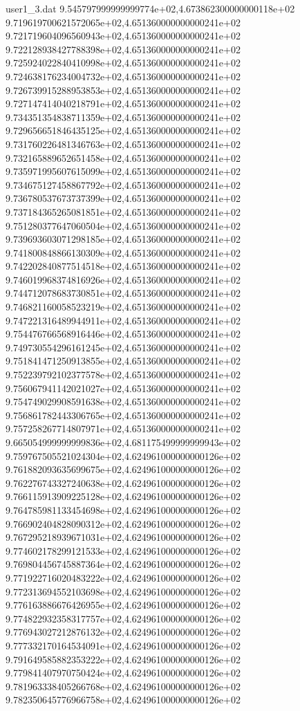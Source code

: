 \begin{filecontents}{user1_3.dat}
9.545797999999999774e+02,4.673862300000000118e+02
9.719619700621572065e+02,4.651360000000000241e+02
9.721719604096560943e+02,4.651360000000000241e+02
9.722128938427788398e+02,4.651360000000000241e+02
9.725924022840410998e+02,4.651360000000000241e+02
9.724638176234004732e+02,4.651360000000000241e+02
9.726739915288953853e+02,4.651360000000000241e+02
9.727147414040218791e+02,4.651360000000000241e+02
9.734351354838711359e+02,4.651360000000000241e+02
9.729656651846435125e+02,4.651360000000000241e+02
9.731760226481346763e+02,4.651360000000000241e+02
9.732165889652651458e+02,4.651360000000000241e+02
9.735971995607615099e+02,4.651360000000000241e+02
9.734675127458867792e+02,4.651360000000000241e+02
9.736780537673737399e+02,4.651360000000000241e+02
9.737184365265081851e+02,4.651360000000000241e+02
9.751280377647060504e+02,4.651360000000000241e+02
9.739693603071298185e+02,4.651360000000000241e+02
9.741800848866130309e+02,4.651360000000000241e+02
9.742202840877514518e+02,4.651360000000000241e+02
9.746019968374816926e+02,4.651360000000000241e+02
9.744712078683730851e+02,4.651360000000000241e+02
9.746821160058523219e+02,4.651360000000000241e+02
9.747221316489944911e+02,4.651360000000000241e+02
9.754476766568916446e+02,4.651360000000000241e+02
9.749730554296161245e+02,4.651360000000000241e+02
9.751841471250913855e+02,4.651360000000000241e+02
9.752239792102377578e+02,4.651360000000000241e+02
9.756067941142021027e+02,4.651360000000000241e+02
9.754749029908591638e+02,4.651360000000000241e+02
9.756861782443306765e+02,4.651360000000000241e+02
9.757258267714807971e+02,4.651360000000000241e+02
9.665054999999999836e+02,4.681175499999999943e+02
9.759767505521024304e+02,4.624961000000000126e+02
9.761882093635699675e+02,4.624961000000000126e+02
9.762276743327240638e+02,4.624961000000000126e+02
9.766115913909225128e+02,4.624961000000000126e+02
9.764785981133454698e+02,4.624961000000000126e+02
9.766902404828090312e+02,4.624961000000000126e+02
9.767295218939671031e+02,4.624961000000000126e+02
9.774602178299121533e+02,4.624961000000000126e+02
9.769804456745887364e+02,4.624961000000000126e+02
9.771922716020483222e+02,4.624961000000000126e+02
9.772313694552103698e+02,4.624961000000000126e+02
9.776163886676426955e+02,4.624961000000000126e+02
9.774822932358317757e+02,4.624961000000000126e+02
9.776943027212876132e+02,4.624961000000000126e+02
9.777332170164534091e+02,4.624961000000000126e+02
9.791649585882353222e+02,4.624961000000000126e+02
9.779841407970750424e+02,4.624961000000000126e+02
9.781963338405266768e+02,4.624961000000000126e+02
9.782350645776966758e+02,4.624961000000000126e+02

\end{filecontents}
